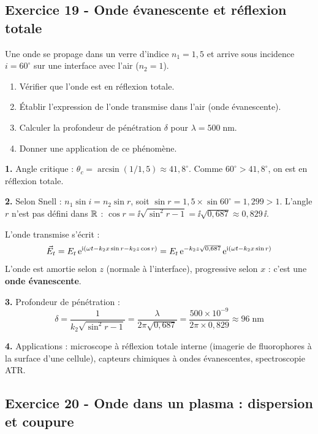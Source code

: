 \documentclass[12pt,a4paper]{article}
\begin{document}
\subsection*{Exercice 19 - Onde évanescente et réflexion totale \niveau{\difficile}}

\begin{boiteexercice}
Une onde se propage dans un verre d'indice $n_1 = 1{,}5$ et arrive sous incidence $i = 60^\circ$ sur une interface avec l'air ($n_2 = 1$).
\begin{enumerate}
  \item Vérifier que l'onde est en réflexion totale.
  \item Établir l'expression de l'onde transmise dans l'air (onde évanescente).
  \item Calculer la profondeur de pénétration $\delta$ pour $\lambda = 500\;\text{nm}$.
  \item Donner une application de ce phénomène.
\end{enumerate}
\end{boiteexercice}

\begin{boitecorrige}
\textbf{1.} Angle critique : $\theta_c = \arcsin(1/1{,}5) \approx 41{,}8^\circ$. Comme $60^\circ > 41{,}8^\circ$, on est en réflexion totale.

\textbf{2.} Selon Snell : $n_1\sin i = n_2\sin r$, soit $\sin r = 1{,}5\times\sin 60^\circ = 1{,}299 > 1$. L'angle $r$ n'est pas défini dans $\mathbb{R}$ : $\cos r = \ii\sqrt{\sin^2 r - 1} = \ii\sqrt{0{,}687} \approx 0{,}829\,\ii$.

L'onde transmise s'écrit :
\[
\vec{E}_t = E_t\,\mathrm{e}^{\mathrm{i}(\omega t - k_2 x\sin r - k_2 z\cos r)} = E_t\,\mathrm{e}^{-k_2 z\sqrt{0{,}687}}\,\mathrm{e}^{\mathrm{i}(\omega t - k_2 x\sin r)}
\]
L'onde est amortie selon $z$ (normale à l'interface), progressive selon $x$ : c'est une \textbf{onde évanescente}.

\textbf{3.} Profondeur de pénétration :
\[
\delta = \frac{1}{k_2\sqrt{\sin^2 r - 1}} = \frac{\lambda}{2\pi\sqrt{0{,}687}} = \frac{500\times10^{-9}}{2\pi\times 0{,}829} \approx 96\;\text{nm}
\]

\textbf{4.} Applications : microscope à réflexion totale interne (imagerie de fluorophores à la surface d'une cellule), capteurs chimiques à ondes évanescentes, spectroscopie ATR.
\end{boitecorrige}

\subsection*{Exercice 20 - Onde dans un plasma : dispersion et coupure \niveau{\difficile}}
\end{document}
